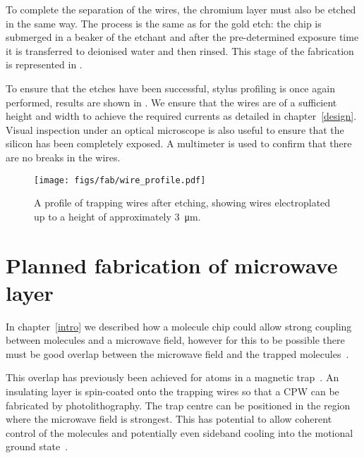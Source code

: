 %
To complete the separation of the wires, the chromium layer must also be etched
in the same way. The process is the same as for the gold etch: the chip is
submerged in a beaker of the etchant and after the pre-determined exposure time
it is transferred to deionised water and then rinsed. This stage of the
fabrication is represented in . 

To ensure that the etches have been successful, stylus profiling is once again
performed, results are shown in . We ensure that
the wires are of a sufficient height and width to achieve the required currents
as detailed in chapter~\ref{design}. Visual inspection under an optical
microscope is also useful to ensure that the silicon has been completely
exposed. A multimeter is used to confirm that there are no breaks in the wires.



\begin{figure}
\centering
  \texttt{[image: figs/fab/wire\_profile.pdf]}
  \caption{A profile of trapping wires after etching, showing wires
  electroplated up to a height of approximately \SI{3}{\micro\meter}.
  }
  \label{fab:fig:endprofile}
\end{figure}

\section{Planned fabrication of microwave layer}
\label{fab:planned}

In chapter~\ref{intro} 
we described how a molecule chip could allow strong coupling between \CaF{}
molecules and a microwave field, however for this to be possible there must be
good overlap between the microwave field and the trapped
molecules~\cite{Andre2006}.
%

This overlap has previously been achieved for atoms in a magnetic
trap~\cite{Treutlein2008}. An insulating layer is spin-coated onto the trapping
wires so that a CPW  can be fabricated by
photolithography. The trap centre can be positioned in the region where the
microwave field is strongest. This has potential to allow coherent control of
the molecules and potentially even sideband cooling into the motional ground
state~\cite{Andre2006}.
%

